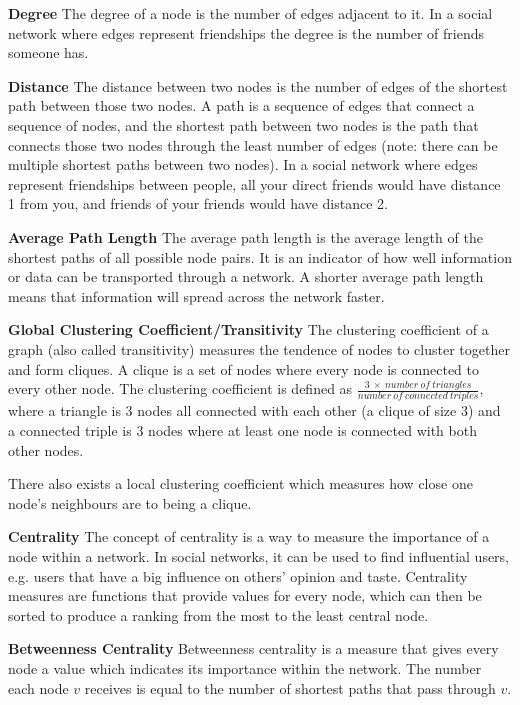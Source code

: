 \textbf{Degree} The degree of a node is the number of edges adjacent to it. In a social network where edges represent friendships the degree is the number of friends someone has.
\newline

\textbf{Distance} The distance between two nodes is the number of edges of the shortest path between those two nodes. A path is a sequence of edges that connect a sequence of nodes, and the shortest path between two nodes is the path that connects those two nodes through the least number of edges (note: there can be multiple shortest paths between two nodes). In a social network where edges represent friendships between people, all your direct friends would have distance 1 from you, and friends of your friends would have distance 2.
\newline

\textbf{Average Path Length} The average path length is the average length of the shortest paths of all possible node pairs. It is an indicator of how well information or data can be transported through a network. A shorter average path length means that information will spread across the network faster.
\newline

\textbf{Global Clustering Coefficient/Transitivity} The clustering coefficient of a graph (also called transitivity) measures the tendence of nodes to cluster together and form cliques. A clique is a set of nodes where every node is connected to every other node. The clustering coefficient is defined as $\frac{3\:\times\:number\:of\:triangles}{number\:of\:connected\:triples}$, where a triangle is 3 nodes all connected with each other (a clique of size 3) and a connected triple is 3 nodes where at least one node is connected with both other nodes.

There also exists a local clustering coefficient which measures how close one node's neighbours are to being a clique.
\newline

\textbf{Centrality} The concept of centrality is a way to measure the importance of a node within a network. In social networks, it can be used to find influential users, e.g. users that have a big influence on others' opinion and taste. Centrality measures are functions that provide values for every node, which can then be sorted to produce a ranking from the most to the least central node.
\newline

\textbf{Betweenness Centrality} Betweenness centrality is a measure that gives every node a value which indicates its importance within the network. The number each node $v$ receives is equal to the number of shortest paths that pass through $v$.

